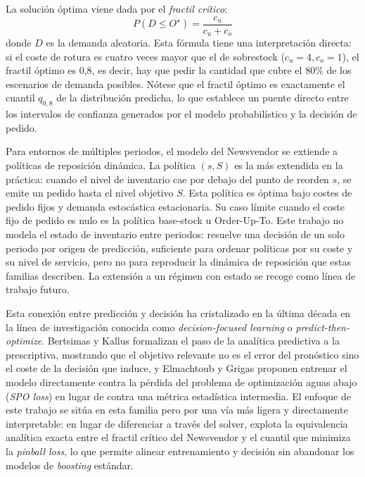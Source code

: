 La solución óptima viene dada por el \textit{fractil crítico}:
\begin{equation}
    P(D \leq O^\star) = \frac{c_u}{c_u + c_o}
\end{equation}
donde $D$ es la demanda aleatoria. Esta fórmula tiene una interpretación directa: si el coste de rotura es cuatro veces mayor que el de sobrestock ($c_u = 4, c_o = 1$), el fractil óptimo es 0,8, es decir, hay que pedir la cantidad que cubre el 80\% de los escenarios de demanda posibles. Nótese que el fractil óptimo es exactamente el cuantil $q_{0{,}8}$ de la distribución predicha, lo que establece un puente directo entre los intervalos de confianza generados por el modelo probabilístico y la decisión de pedido.

Para entornos de múltiples periodos, el modelo del Newsvendor se extiende a políticas de reposición dinámica. La política $(s, S)$ \cite{silver1998inventory} es la más extendida en la práctica: cuando el nivel de inventario cae por debajo del punto de reorden $s$, se emite un pedido hasta el nivel objetivo $S$. Esta política es óptima bajo costes de pedido fijos y demanda estocástica estacionaria. Su caso límite cuando el coste fijo de pedido es nulo es la política base-stock u Order-Up-To. Este trabajo no modela el estado de inventario entre periodos: resuelve una decisión de un solo periodo por origen de predicción, suficiente para ordenar políticas por su coste y su nivel de servicio, pero no para reproducir la dinámica de reposición que estas familias describen. La extensión a un régimen con estado se recoge como línea de trabajo futuro.

Esta conexión entre predicción y decisión ha cristalizado en la última década en la línea de investigación conocida como \textit{decision-focused learning} o \textit{predict-then-optimize}. Bertsimas y Kallus \cite{bertsimas2020prescriptive} formalizan el paso de la analítica predictiva a la prescriptiva, mostrando que el objetivo relevante no es el error del pronóstico sino el coste de la decisión que induce, y Elmachtoub y Grigas \cite{elmachtoub2022spo} proponen entrenar el modelo directamente contra la pérdida del problema de optimización aguas abajo (\textit{SPO loss}) en lugar de contra una métrica estadística intermedia. El enfoque de este trabajo se sitúa en esta familia pero por una vía más ligera y directamente interpretable: en lugar de diferenciar a través del solver, explota la equivalencia analítica exacta entre el fractil crítico del Newsvendor y el cuantil que minimiza la \textit{pinball loss}, lo que permite alinear entrenamiento y decisión sin abandonar los modelos de \textit{boosting} estándar.

